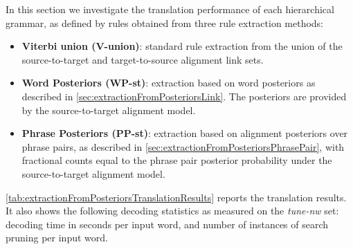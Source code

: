 In this section we investigate the translation performance of each hierarchical
grammar, as defined by rules obtained from three rule extraction methods:
%
\begin{itemize}
  \item \textbf{Viterbi union (V-union)}: standard rule extraction from the union
    of the source-to-target and target-to-source alignment link sets. %
  \item \textbf{Word Posteriors (WP-st)}: extraction based on word posteriors as
    described in \autoref{sec:extractionFromPosteriorsLink}. The posteriors
    are provided by the source-to-target alignment model.
  \item \textbf{Phrase Posteriors (PP-st)}: extraction based on alignment
    posteriors over phrase pairs, as described in
    \autoref{sec:extractionFromPosteriorsPhrasePair}, with fractional counts
    equal to the phrase pair posterior probability under the source-to-target
    alignment model.
\end{itemize}
%
\autoref{tab:extractionFromPosteriorsTranslationResults} reports the
translation results. It also shows the following decoding statistics as measured
on the {\em tune-nw} set: decoding time in seconds per input word, and number of
instances of search pruning per input word.
%
